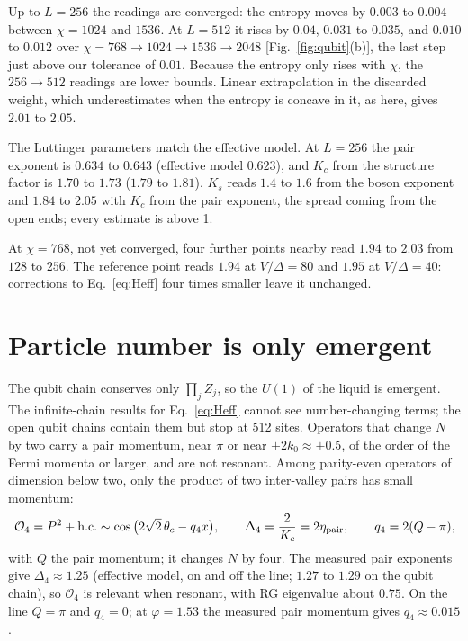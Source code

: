 \documentclass[11pt]{article}
\begin{document}
Up to $L=256$ the readings are converged: the entropy moves by $0.003$ to $0.004$ between $\chi=1024$ and $1536$. At $L=512$ it rises by $0.04$, $0.031$ to $0.035$, and $0.010$ to $0.012$ over $\chi=768\to1024\to1536\to2048$ [Fig.~\ref{fig:qubit}(b)], the last step just above our tolerance of $0.01$. Because the entropy only rises with $\chi$, the $256\to512$ readings are lower bounds. Linear extrapolation in the discarded weight, which underestimates when the entropy is concave in it, as here, gives $2.01$ to $2.05$.

The Luttinger parameters match the effective model. At $L=256$ the pair exponent is $0.634$ to $0.643$ (effective model $0.623$), and $K_c$ from the structure factor is $1.70$ to $1.73$ ($1.79$ to $1.81$). $K_s$ reads $1.4$ to $1.6$ from the boson exponent and $1.84$ to $2.05$ with $K_c$ from the pair exponent, the spread coming from the open ends; every estimate is above 1.

At $\chi=768$, not yet converged, four further points nearby read $1.94$ to $2.03$ from $128$ to $256$. The reference point reads $1.94$ at $V/\Delta=80$ and $1.95$ at $V/\Delta=40$: corrections to Eq.~\eqref{eq:Heff} four times smaller leave it unchanged.

\section{Particle number is only emergent}

The qubit chain conserves only $\prod_jZ_j$, so the $U(1)$ of the liquid is emergent. The infinite-chain results for Eq.~\eqref{eq:Heff} cannot see number-changing terms; the open qubit chains contain them but stop at 512 sites. Operators that change $N$ by two carry a pair momentum, near $\pi$ or near $\pm2k_0\approx\pm0.5$, of the order of the Fermi momenta or larger, and are not resonant. Among parity-even operators of dimension below two, only the product of two inter-valley pairs has small momentum:
\begin{equation}
\mathcal O_4=P^2+\mathrm{h.c.}\sim\cos\big(2\sqrt2\,\theta_c-q_4x\big),\qquad
\Delta_4=\frac2{K_c}=2\eta_{\rm pair},\qquad q_4=2(Q-\pi),
\label{eq:O4}
\end{equation}
with $Q$ the pair momentum; it changes $N$ by four. The measured pair exponents give $\Delta_4\approx1.25$ (effective model, on and off the line; $1.27$ to $1.29$ on the qubit chain), so $\mathcal O_4$ is relevant when resonant, with RG eigenvalue about $0.75$. On the line $Q=\pi$ and $q_4=0$; at $\varphi=1.53$ the measured pair momentum gives $q_4\approx0.015$.
\end{document}
